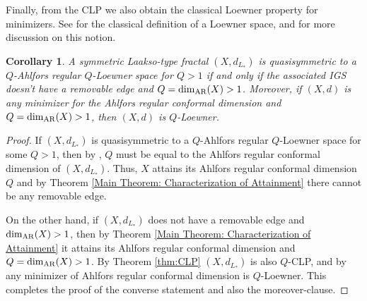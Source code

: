 \documentclass{amsart}
\newcommand{\AR}{{\rm AR}}
\newtheorem{corollary}[equation]{Corollary}
\numberwithin{equation}{section}
\theoremstyle{definition}
\theoremstyle{remark}
\begin{document}
Finally, from the CLP we also obtain the classical Loewner property for minimizers. See \cite{HK} for the classical definition of a Loewner space, and \cite{CEB} for more discussion on this notion.

\begin{corollary}\label{cor:Loewner}
    A symmetric Laakso-type fractal $(X,d_{L_*})$ is quasisymmetric to a $Q$-Ahlfors regular $Q$-Loewner space for $Q>1$ if and only if the associated IGS doesn't have a removable edge and $Q=\dim_{\AR}(X)>1$. Moreover, if  $(X,d)$ is any minimizer for the Ahlfors regular conformal dimension and $Q=\dim_{\AR}(X)>1$, then $(X,d)$ is $Q$-Loewner. 
\end{corollary}
\begin{proof}
If $(X,d_{L_*})$ is quasisymmetric to a $Q$-Ahlfors regular $Q$-Loewner space for some $Q>1$, then by \cite[1.7. Corollary]{TQuasi}, $Q$ must be equal to the Ahlfors regular conformal dimension of $(X,d_{L_*})$. Thus, $X$ attains its Ahlfors regular conformal dimension $Q$ and by Theorem \ref{Main Theorem: Characterization of Attainment} there cannot be any removable edge.

On the other hand, if $(X,d_{L_*})$ does not have a removable edge and $\dim_{\AR}(X)>1$, then by Theorem \ref{Main Theorem: Characterization of Attainment} it attains its Ahlfors regular conformal dimension and $Q=\dim_{\AR}(X)>1$. By Theorem \ref{thm:CLP} $(X,d_{L_*})$ is also $Q$-CLP, and by \cite[\S 1.6]{CEB} any minimizer of Ahlfors regular conformal dimension is $Q$-Loewner. This completes the proof of the converse statement and also the moreover-clause.

\end{proof}






\appendix
\end{document}
